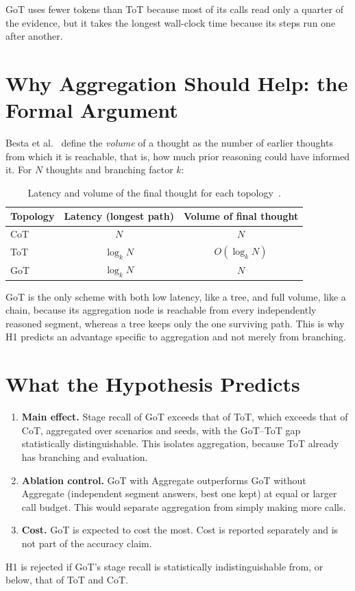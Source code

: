 GoT uses fewer tokens than ToT because most of its calls read only a quarter of the evidence, but it takes the longest wall-clock time because its steps run one after another.

\section{Why Aggregation Should Help: the Formal Argument}
Besta et al.~\cite{besta2024got} define the \emph{volume} of a thought as the number of earlier thoughts from which it is reachable, that is, how much prior reasoning could have informed it. For $N$ thoughts and branching factor $k$:

\begin{table}[H]
\centering
\caption{Latency and volume of the final thought for each topology~\cite{besta2024got}.}
\label{tab:volume}
\small
\begin{tabular}{@{}lcc@{}}
\toprule
\textbf{Topology} & \textbf{Latency (longest path)} & \textbf{Volume of final thought} \\
\midrule
CoT & $N$ & $N$ \\
ToT & $\log_k N$ & $O(\log_k N)$ \\
GoT & $\log_k N$ & $N$ \\
\bottomrule
\end{tabular}
\end{table}

GoT is the only scheme with both low latency, like a tree, and full volume, like a chain, because its aggregation node is reachable from every independently reasoned segment, whereas a tree keeps only the one surviving path. This is why H1 predicts an advantage specific to aggregation and not merely from branching.

\section{What the Hypothesis Predicts}
\begin{enumerate}
\item \textbf{Main effect.} Stage recall of GoT exceeds that of ToT, which exceeds that of CoT, aggregated over scenarios and seeds, with the GoT--ToT gap statistically distinguishable. This isolates aggregation, because ToT already has branching and evaluation.
\item \textbf{Ablation control.} GoT with Aggregate outperforms GoT without Aggregate (independent segment answers, best one kept) at equal or larger call budget. This would separate aggregation from simply making more calls.
\item \textbf{Cost.} GoT is expected to cost the most. Cost is reported separately and is not part of the accuracy claim.
\end{enumerate}
H1 is rejected if GoT's stage recall is statistically indistinguishable from, or below, that of ToT and CoT.

